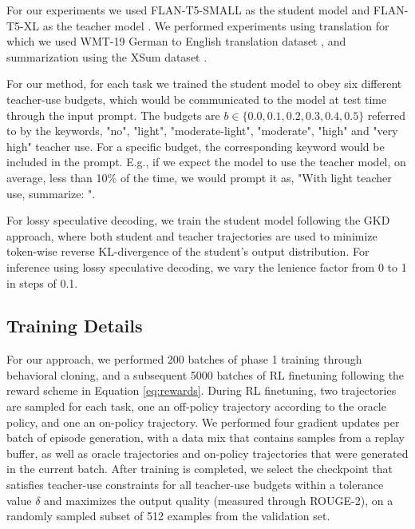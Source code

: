 For our experiments we used FLAN-T5-SMALL as the student model and FLAN-T5-XL as the teacher model \cite{chung2024scaling}. We performed experiments using translation for which we used WMT-19 German to English translation dataset \cite{barrault2019findings}, and summarization using the XSum dataset \cite{xsum-emnlp}.

For our method, for each task we trained the student model to obey six different teacher-use budgets, which would be communicated to the model at test time through the input prompt. The budgets are $b \in \{0.0, 0.1, 0.2, 0.3, 0.4, 0.5\}$ referred to by the keywords, "no", "light", "moderate-light", "moderate", "high" and "very high" teacher use. For a specific budget, the corresponding keyword would be included in the prompt. E.g., if we expect the model to use the teacher model, on average, less than 10\% of the time, we would prompt it as, "With light teacher use, summarize: ".

For lossy speculative decoding, we train the student model following the GKD approach, where both student and teacher trajectories are used to minimize token-wise reverse KL-divergence of the student's output distribution. For inference using lossy speculative decoding, we vary the lenience factor from 0 to 1 in steps of 0.1.

\subsection{Training Details}

For our approach, we performed 200 batches of phase 1 training through behavioral cloning, and a subsequent 5000 batches of RL finetuning following the reward scheme in Equation \ref{eq:rewards}. During RL finetuning, two trajectories are sampled for each task, one an off-policy trajectory according to the oracle policy, and one an on-policy trajectory. We performed four gradient updates per batch of episode generation, with a data mix that contains samples from a replay buffer, as well as oracle trajectories and on-policy trajectories that were generated in the current batch. After training is completed, we select the checkpoint that satisfies teacher-use constraints for all teacher-use budgets within a tolerance value $\delta$ and maximizes the output quality (measured through ROUGE-2), on a randomly sampled subset of 512 examples from the validation set.

